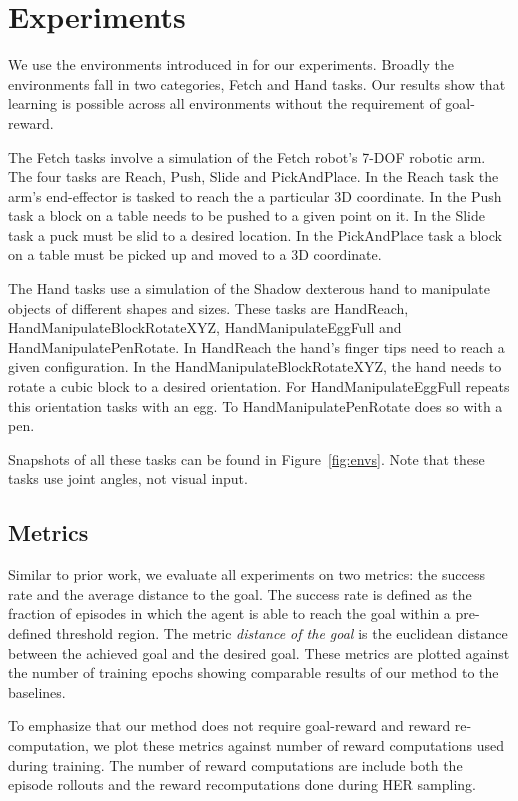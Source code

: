 \section{Experiments}
\label{sec:experiments}
We use the environments introduced in \citet{plappert2018multi} for our experiments.
Broadly the environments fall in two categories, Fetch and Hand tasks.
Our results show that learning is possible across all environments
without the requirement of goal-reward.

The Fetch tasks involve a simulation of the Fetch robot's 7-DOF robotic arm. The four tasks are Reach, Push,
Slide and PickAndPlace.
In the Reach task the arm's end-effector is tasked to reach the a particular 3D coordinate. 
In the Push task a block on a table needs to be pushed to a given point on it.
In the Slide task a puck must be slid to a desired location.
In the PickAndPlace task a block on a table must be picked up and moved to a
3D coordinate.

The Hand tasks use a simulation of the Shadow dexterous hand to manipulate objects of
different shapes and sizes. These tasks are HandReach,
HandManipulateBlockRotateXYZ, HandManipulateEggFull and HandManipulatePenRotate.
In HandReach the hand's finger tips need to reach a given configuration.
In the HandManipulateBlockRotateXYZ, the hand needs to rotate a cubic
block to a desired orientation.
For HandManipulateEggFull repeats this orientation tasks with an egg.
To HandManipulatePenRotate does so with a pen.

Snapshots of all these tasks can be found in Figure~\ref{fig:envs}. Note that
these tasks use joint angles, not visual input.


\subsection{Metrics}
Similar to prior work, we evaluate all experiments on two metrics: the success
rate and the average distance to the goal. The success rate is defined as the
fraction of episodes in which the agent is able to reach the goal within a
pre-defined threshold region.
The metric \emph{distance of the goal} is the euclidean distance between
the achieved goal and the desired goal.
These metrics are plotted against the number of training epochs showing
comparable results of our method to the baselines.

To emphasize that our method does not require goal-reward
and reward re-computation, we plot these metrics against
number of reward computations used during training. The number of reward
computations are include both the episode rollouts and the reward recomputations
done during HER sampling.

